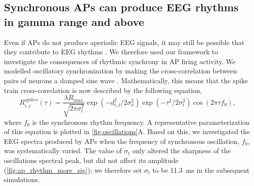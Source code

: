 \subsection{Synchronous APs can produce EEG rhythms in gamma range and above}
Even if APs do not produce aperiodic EEG signals, it may still be possible that they contribute to EEG rhythms \cite{Thio2023}. We therefore used our framework to investigate the consequences of rhythmic synchrony in AP firing activity. We modelled oscillatory synchronization by making the cross-correlation between pairs of neurons a damped sine wave \cite{Engel1990, Engel1991}. Mathematically, this means that the spike train cross-correlation is now described by the following equation,
\begin{equation} \label{eq:rhythmic_synchrony}
    R^{spikes}_{i,j}(\tau) = \frac{\lambda R_{max}}{\sqrt{2\pi \sigma_t^2}} \exp(-d_{i,j}^2 / 2\sigma_x^2) \exp(-\tau^2/2\sigma_t^2) \cos(2\pi\tau f_0)\mathrm{,}
\end{equation} 
where $f_0$ is the synchronous rhythm frequency. A representative parameterization of this equation is plotted in {\autoref{fig:oscillations}A}. Based on this, we investigated the EEG spectra produced by APs when the frequency of synchronous oscillation, $f_0$, was systematically varied. The value of $\sigma_t$ only altered the sharpness of the oscillations spectral peak, but did not affect its amplitude  ({\autoref{fig:ap_rhythm_more_sig}}); we therefore set $\sigma_t$ to be 11.3~\unit{\milli\second} in the subsequent simulations.

